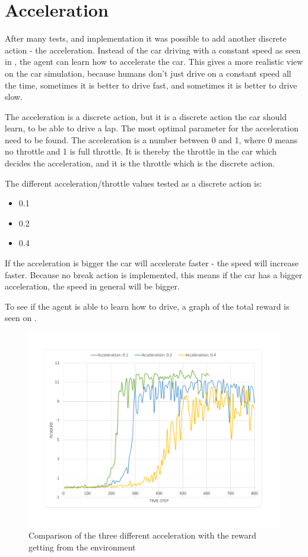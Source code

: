 \section{Acceleration}\label{sectionAcceleration_new}
After many tests, and implementation it was possible to add another discrete action - the acceleration. Instead of the car driving with a constant speed as seen in , the agent can learn how to accelerate the car. This gives a more realistic view on the car simulation, because humans don't just drive on a constant speed all the time, sometimes it is better to drive fast, and sometimes it is better to drive slow.  

The acceleration is a discrete action, but it is a discrete action the car should learn, to be able to drive a lap. The most optimal parameter for the acceleration need to be found. The acceleration is a number between 0 and 1, where 0 means no throttle and 1 is full throttle. It is thereby the throttle in the car which decides the acceleration, and it is the throttle which is the discrete action.

The different acceleration/throttle values tested as a discrete action is:
\begin{itemize}
	\item 0.1
	\item 0.2
	\item 0.4
\end{itemize} 
   
If the acceleration is bigger the car will accelerate faster - the speed will increase faster. Because no break action is implemented, this means if the car has a bigger acceleration, the speed in general will be bigger. 

To see if the agent is able to learn how to drive, a graph of the total reward is seen on .

\begin{figure}[H]
	\centering
	\includegraphics[width=1\textwidth]{Figures/Result/change_of_acceleration_new_reward_graph.pdf}
	\caption{Comparison of the three different acceleration with the reward getting from the environment}
	\label{fig:change_of_acceleration_new_reward_graph}
\end{figure} 

